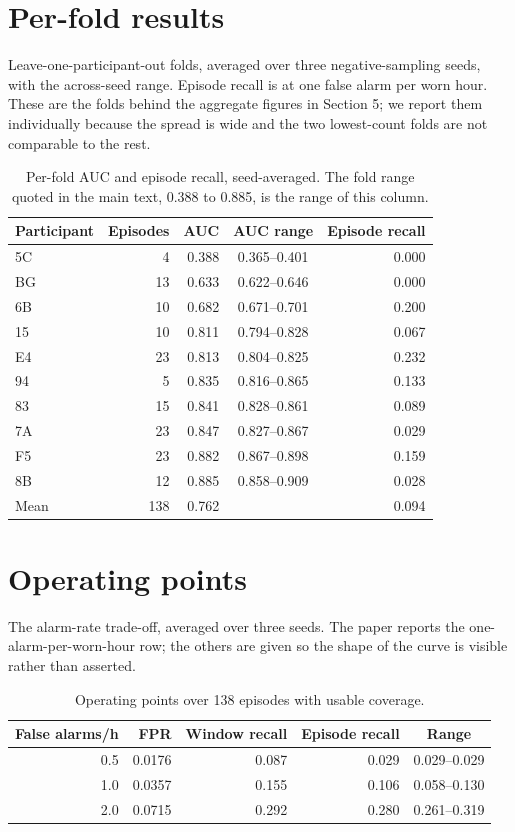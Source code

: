 \section{Per-fold results}
\label{app:perfold}

Leave-one-participant-out folds, averaged over three negative-sampling
seeds, with the across-seed range. Episode recall is at one false alarm
per worn hour. These are the folds behind the aggregate figures in
Section 5; we report them individually because the spread is wide and the
two lowest-count folds are not comparable to the rest.

\begin{table}[h]
\centering
\begin{tabular}{lrrcr}
\toprule
Participant & Episodes & AUC & AUC range & Episode recall \\
\midrule
5C & 4 & 0.388 & 0.365--0.401 & 0.000 \\
BG & 13 & 0.633 & 0.622--0.646 & 0.000 \\
6B & 10 & 0.682 & 0.671--0.701 & 0.200 \\
15 & 10 & 0.811 & 0.794--0.828 & 0.067 \\
E4 & 23 & 0.813 & 0.804--0.825 & 0.232 \\
94 & 5 & 0.835 & 0.816--0.865 & 0.133 \\
83 & 15 & 0.841 & 0.828--0.861 & 0.089 \\
7A & 23 & 0.847 & 0.827--0.867 & 0.029 \\
F5 & 23 & 0.882 & 0.867--0.898 & 0.159 \\
8B & 12 & 0.885 & 0.858--0.909 & 0.028 \\
\midrule
Mean & 138 & 0.762 & & 0.094 \\
\bottomrule
\end{tabular}
\caption{Per-fold AUC and episode recall, seed-averaged. The fold range quoted in the main text, 0.388 to 0.885, is the range of this column.}
\end{table}

\section{Operating points}
\label{app:operating}

The alarm-rate trade-off, averaged over three seeds. The paper reports the
one-alarm-per-worn-hour row; the others are given so the shape of the
curve is visible rather than asserted.

\begin{table}[h]
\centering
\begin{tabular}{rrrrc}
\toprule
False alarms/h & FPR & Window recall & Episode recall & Range \\
\midrule
0.5 & 0.0176 & 0.087 & 0.029 & 0.029--0.029 \\
1.0 & 0.0357 & 0.155 & 0.106 & 0.058--0.130 \\
2.0 & 0.0715 & 0.292 & 0.280 & 0.261--0.319 \\
\bottomrule
\end{tabular}
\caption{Operating points over 138 episodes with usable coverage.}
\end{table}
